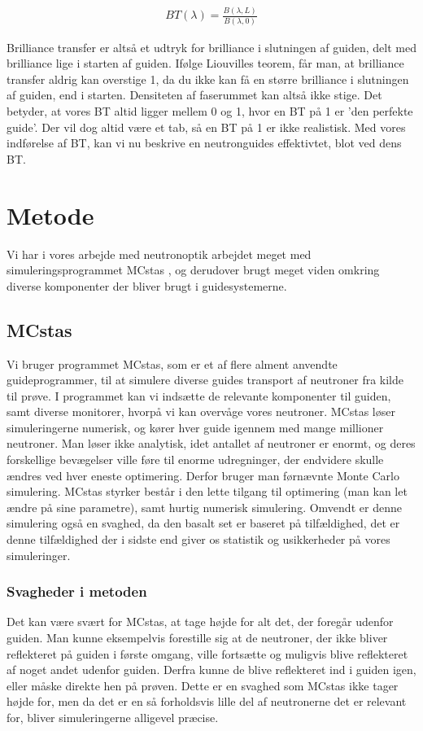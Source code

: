 \documentclass[12pt,oneside,a4paper]{article}
\begin{document}
{{{{{\begin{align}
BT(\lambda)=\frac{B(\lambda, L)}{B(\lambda,0)}
\end{align}

Brilliance transfer er altså et udtryk for brilliance i slutningen af guiden, delt med brilliance lige i starten af guiden. Ifølge Liouvilles teorem,\cite{Kaspar_PhD} får man, at brilliance transfer aldrig kan overstige 1, da du ikke kan få en større brilliance i slutningen af guiden, end i starten. Densiteten af faserummet kan altså ikke stige. Det betyder, at vores BT altid ligger mellem 0 og 1, hvor en BT på 1 er 'den perfekte guide'. Der vil dog altid være et tab, så en BT på 1 er ikke realistisk. Med vores indførelse af BT, kan vi nu beskrive en neutronguides effektivtet, blot ved dens BT. \cite{report:ess_optimizations}


\section{Metode}
Vi har i vores arbejde med neutronoptik arbejdet meget med simuleringsprogrammet MCstas \cite{doi:10.1080/10448639908233684}, og derudover brugt meget viden omkring diverse komponenter der bliver brugt i guidesystemerne.


\subsection{MCstas}
Vi bruger programmet MCstas, som er et af flere alment anvendte guideprogrammer, til at simulere diverse guides transport af neutroner fra kilde til prøve. I programmet kan vi indsætte de relevante komponenter til guiden, samt diverse monitorer, hvorpå vi kan overvåge vores neutroner. MCstas løser simuleringerne numerisk, og kører hver guide igennem med mange millioner neutroner. Man løser ikke analytisk, idet antallet af neutroner er enormt, og deres forskellige bevægelser ville føre til enorme udregninger, der endvidere skulle ændres ved hver eneste optimering. Derfor bruger man førnævnte Monte Carlo simulering. MCstas styrker består i den lette tilgang til optimering (man kan let ændre på sine parametre), samt hurtig numerisk simulering. Omvendt er denne simulering også en svaghed, da den basalt set er baseret på tilfældighed, det er denne tilfældighed der i sidste end giver os statistik og usikkerheder på vores simuleringer.

\subsubsection{Svagheder i metoden}
Det kan være svært for MCstas, at tage højde for alt det, der foregår udenfor guiden. Man kunne eksempelvis forestille sig at de neutroner, der ikke bliver reflekteret på guiden i første omgang, ville fortsætte og muligvis blive reflekteret af noget andet udenfor guiden. Derfra kunne de blive reflekteret ind i guiden igen, eller måske direkte hen på prøven. Dette er en svaghed som MCstas ikke tager højde for, men da det er en så forholdsvis lille del af neutronerne det er relevant for, bliver simuleringerne alligevel præcise.


}}}}}
\end{document}

